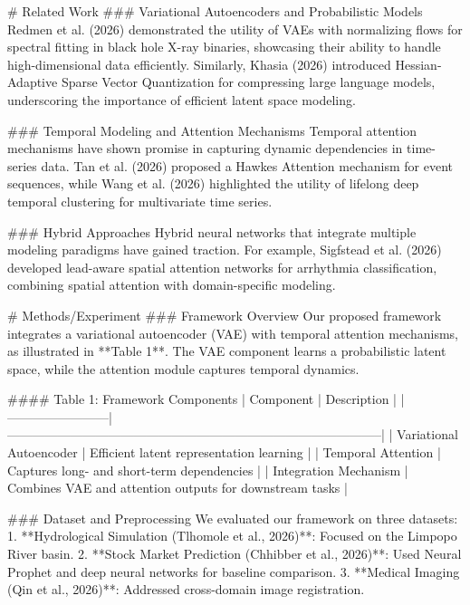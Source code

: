 # Related Work
### Variational Autoencoders and Probabilistic Models
Redmen et al. (2026) demonstrated the utility of VAEs with normalizing flows for spectral fitting in black hole X-ray binaries, showcasing their ability to handle high-dimensional data efficiently. Similarly, Khasia (2026) introduced Hessian-Adaptive Sparse Vector Quantization for compressing large language models, underscoring the importance of efficient latent space modeling.

### Temporal Modeling and Attention Mechanisms
Temporal attention mechanisms have shown promise in capturing dynamic dependencies in time-series data. Tan et al. (2026) proposed a Hawkes Attention mechanism for event sequences, while Wang et al. (2026) highlighted the utility of lifelong deep temporal clustering for multivariate time series.

### Hybrid Approaches
Hybrid neural networks that integrate multiple modeling paradigms have gained traction. For example, Sigfstead et al. (2026) developed lead-aware spatial attention networks for arrhythmia classification, combining spatial attention with domain-specific modeling.

# Methods/Experiment
### Framework Overview
Our proposed framework integrates a variational autoencoder (VAE) with temporal attention mechanisms, as illustrated in **Table 1**. The VAE component learns a probabilistic latent space, while the attention module captures temporal dynamics.

#### Table 1: Framework Components
| Component              | Description                                                                             |
|------------------------|-----------------------------------------------------------------------------------------|
| Variational Autoencoder | Efficient latent representation learning                                               |
| Temporal Attention     | Captures long- and short-term dependencies                                              |
| Integration Mechanism  | Combines VAE and attention outputs for downstream tasks                                 |

### Dataset and Preprocessing
We evaluated our framework on three datasets:
1. **Hydrological Simulation (Tlhomole et al., 2026)**: Focused on the Limpopo River basin.
2. **Stock Market Prediction (Chhibber et al., 2026)**: Used Neural Prophet and deep neural networks for baseline comparison.
3. **Medical Imaging (Qin et al., 2026)**: Addressed cross-domain image registration.

